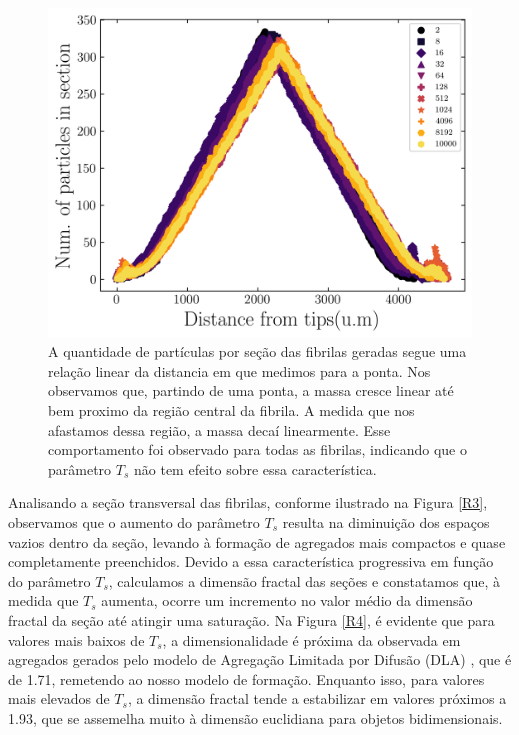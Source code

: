 \documentclass{article}
\begin{document}
\begin{figure}[H]
    \centering
    \includegraphics[width=\textwidth]{figures/tips.png}

    \caption{A quantidade de partículas por seção das fibrilas geradas segue uma relação linear da distancia em que 
    medimos para a ponta. Nos observamos que, partindo de uma ponta, a massa cresce linear até bem proximo da região
    central da fibrila. A medida que nos afastamos dessa região, a massa decaí linearmente. Esse comportamento foi 
    observado para todas as fibrilas, indicando que o parâmetro $T_{s}$ não tem efeito sobre essa característica.} 

    \label{R2}
\end{figure}


Analisando a seção transversal das fibrilas, conforme ilustrado na Figura \ref{R3}, observamos que o aumento do 
parâmetro \(T_{s}\) resulta na diminuição dos espaços vazios dentro da seção, levando à formação de agregados mais 
compactos e quase completamente preenchidos. Devido a essa característica progressiva em função do parâmetro 
\(T_{s}\), calculamos a dimensão fractal das seções e constatamos que, à medida que \(T_{s}\) aumenta, ocorre um 
incremento no valor médio da dimensão fractal da seção até atingir uma saturação. Na Figura \ref{R4}, é evidente 
que para valores mais baixos de \(T_{s}\), a dimensionalidade é próxima da observada em agregados gerados pelo 
modelo de Agregação Limitada por Difusão (DLA) \cite{Witten1983}, que é de 1.71, remetendo ao nosso modelo de 
formação. Enquanto isso, para valores mais elevados de \(T_{s}\), a dimensão fractal tende a estabilizar em valores 
próximos a 1.93, que se assemelha muito à dimensão euclidiana para objetos bidimensionais. 
\end{document}
